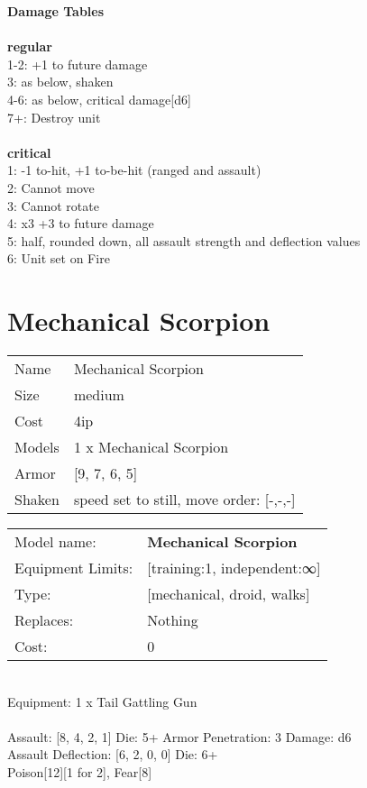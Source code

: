 {\bf Damage Tables} \\
\ \\ {\bf regular } \\
1-2: +1 to future damage \\
3: as below, shaken \\
4-6: as below, critical damage[d6] \\
7+: Destroy unit \\
\ \\ {\bf critical } \\
1: -1 to-hit, +1 to-be-hit (ranged and assault) \\
2: Cannot move \\
3: Cannot rotate \\
4: x3 +3 to future damage \\
5: half, rounded down, all assault strength and deflection values \\
6: Unit set on Fire \\










\pagebreak\pagebreak

\section{ Mechanical Scorpion }

\begin{tabular}{ll}
  Name & Mechanical Scorpion \\
  Size & medium\\
  Cost & 4ip\\
  Models & 1 x Mechanical Scorpion\\
  Armor & [9, 7, 6, 5]\\
  Shaken & speed set to still, move order: [-,-,-]\\
\end{tabular}

\noindent 

\noindent
\begin{tabular}{ll}
Model name: &{\bf Mechanical Scorpion } \\
Equipment Limits: &[training:1, independent:∞] \\
Type: &[mechanical, droid, walks] \\
Replaces: &Nothing \\
Cost: & 0\\
\end{tabular}
\ \\
Equipment: 1 x Tail Gattling Gun \\
\ \\
Assault: [8, 4, 2, 1] Die: 5+ Armor Penetration: 3 Damage: d6 \\
Assault Deflection: [6, 2, 0, 0] Die: 6+\\
\indent Poison[12][1 for 2], Fear[8]\\ 
 
